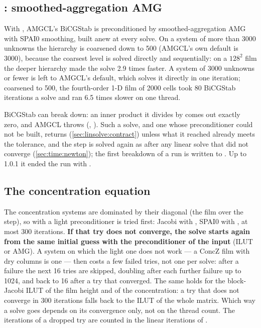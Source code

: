 \subsection{: smoothed-aggregation AMG}
\label{sec:linsolve:amgcl}

With , AMGCL's BiCGStab is preconditioned by smoothed-aggregation
AMG with SPAI0 smoothing, built anew at every solve. On a system of more
than 3000 unknowns the hierarchy is coarsened down to 500 (AMGCL's own default
is 3000), because the coarsest level is solved directly and sequentially: on a
$128^2$ film the deeper hierarchy made the solve 2.9 times faster. A system of
3000 unknowns or fewer is left to AMGCL's default, which solves it directly in
one iteration; coarsened to 500, the fourth-order 1-D film of 2000 cells took
80 BiCGStab iterations a solve and ran 6.5 times slower on one thread.

BiCGStab can break down: an inner product it divides by comes out exactly
zero, and AMGCL throws (, ). Such a solve, and one whose preconditioner could not be built,
returns  (\cref{sec:linsolve:contract}) unless what it reached already
meets the tolerance, and the step is solved again as after any linear solve
that did not converge (\cref{sec:time:newton}); the first breakdown of a run
is written to . Up to 1.0.1 it ended the run with
.

\subsection{The concentration equation}
\label{sec:linsolve:conc}

The concentration systems are dominated by their diagonal (the film over the
step), so with   a light preconditioner is
tried first: Jacobi with , SPAI0 with , at most 300
iterations. \textbf{If that try does not
converge, the solve starts again from the same initial guess with the
preconditioner of the input} (ILUT or AMG). A system on which the light one
does not work --- a ConcZ film with dry columns is one --- then costs a few
failed tries, not one per solve: after a failure the next 16 tries are
skipped, doubling after each further failure up to 1024, and back to 16 after
a try that converged. The same holds for the block-Jacobi ILUT of the film
height and of the concentration: a try that does not converge in 300
iterations falls back to the ILUT of the whole matrix. Which way a solve goes
depends on its convergence only, not on the thread count. The iterations of a
dropped try are counted in the linear iterations of .

